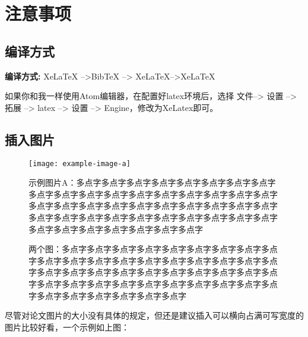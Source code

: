 \documentclass[AutoFakeBold]{LZUThesis-PgD&PhD}
\begin{document}
\mainmatter

\chapter{注意事项}

\section{编译方式}

 {\bfseries 编译方式:} XeLaTeX -->BibTeX --> XeLaTeX-->XeLaTeX

如果你和我一样使用Atom编辑器，在配置好latex环境后，选择 文件--> 设置 --> 拓展 --> latex --> 设置 --> Engine，修改为XeLatex即可。

\section{插入图片}

\begin{figure}[hbt!]
    \texttt{[image: example-image-a]}
    \centering
    \caption{示例图片A：多点字多点字多点字多点字多点字多点字多点字多点字多点字多点字多点字多点字多点字多点字多点字多点字多点字多点字多点字多点字多点字多点字多点字多点字多点字多点字多点字多点字多点字多点字多点字多点字多点字多点字多点字多点字多点字多点字多点字多点字多点字多点字多点字多点字多点字}
    \label{fig:obj_dect}
\end{figure}


\begin{figure}[H]
    \centering
    \caption{两个图：多点字多点字多点字多点字多点字多点字多点字多点字多点字多点字多点字多点字多点字多点字多点字多点字多点字多点字多点字多点字多点字多点字多点字多点字多点字多点字多点字多点字多点字多点字多点字多点字多点字多点字多点字多点字多点字多点字多点字多点字多点字多点字多点字多点字多点字}
    \label{fig_ldr}
\end{figure}

尽管对论文图片的大小没有具体的规定，但还是建议插入可以横向占满可写宽度的图片比较好看，一个示例如上图：

\end{document}

